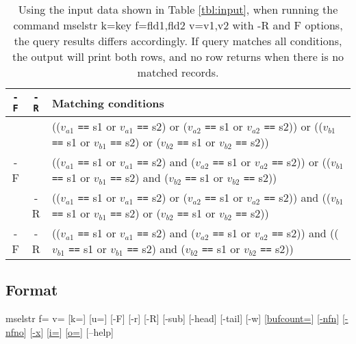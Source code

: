\documentclass[a4paper]{jarticle}
\begin{document}
\begin{table}[htbp]
\begin{center}
\caption{Using the input data shown in Table \ref{tbl:input}, when running the command 
mselstr k=key f=fld1,fld2 v=v1,v2 with -R and F options, the query results differs accordingly.  
If query matches all conditions, the output will print both rows, and no row returns when there is no matched records. \label{tbl:cond}}

{\small
\begin{tabular}{ccl}
\hline
\verb|-F| & \verb|-R| & Matching conditions  \\
\hline
   &    &
(($v_{a1}$ \verb|==| s1 or $v_{a1}$ \verb|==| s2)  or
 ($v_{a2}$ \verb|==| s1 or $v_{a2}$ \verb|==| s2)) or
(($v_{b1}$ \verb|==| s1 or $v_{b1}$ \verb|==| s2)  or
 ($v_{b2}$ \verb|==| s1 or $v_{b2}$ \verb|==| s2)) \\
-F &    &
(($v_{a1}$ \verb|==| s1 or $v_{a1}$ \verb|==| s2)  and
 ($v_{a2}$ \verb|==| s1 or $v_{a2}$ \verb|==| s2)) or
(($v_{b1}$ \verb|==| s1 or $v_{b1}$ \verb|==| s2)  and
 ($v_{b2}$ \verb|==| s1 or $v_{b2}$ \verb|==| s2)) \\
   & -R & 
(($v_{a1}$ \verb|==| s1 or $v_{a1}$ \verb|==| s2)  or
 ($v_{a2}$ \verb|==| s1 or $v_{a2}$ \verb|==| s2)) and
(($v_{b1}$ \verb|==| s1 or $v_{b1}$ \verb|==| s2)  or
 ($v_{b2}$ \verb|==| s1 or $v_{b2}$ \verb|==| s2)) \\
-F & -R & 
(($v_{a1}$ \verb|==| s1 or $v_{a1}$ \verb|==| s2)  and
 ($v_{a2}$ \verb|==| s1 or $v_{a2}$ \verb|==| s2)) and
(($v_{b1}$ \verb|==| s1 or $v_{b1}$ \verb|==| s2)  and
 ($v_{b2}$ \verb|==| s1 or $v_{b2}$ \verb|==| s2)) \\
\hline
\end{tabular}
}

\end{center}
\end{table}

\subsection*{Format}
mselstr f= v= [k=]  [u=] [-F] [-r] [-R] [-sub] [-head] [-tail] [-w]
[\href{run:option.pdf}{bufcount=}]
[\href{run:option.pdf}{-nfn}]
[\href{run:option.pdf}{-nfno}]
[\href{run:option.pdf}{-x}]
[\href{run:option.pdf}{i=}]
[\href{run:option.pdf}{o=}]
[--help]\\
\end{document}
